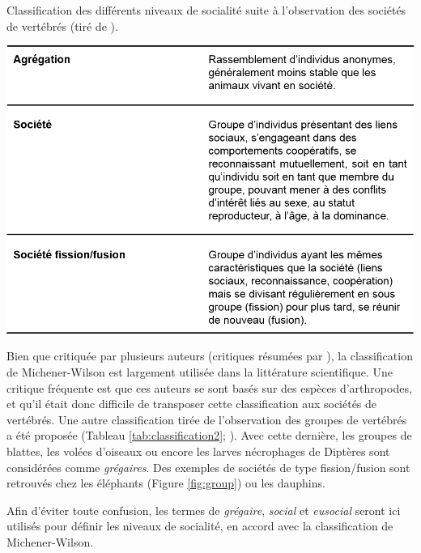 \begin{table}[p]
	\caption[Classification2]{Classification des différents niveaux de socialité suite à l'observation des sociétés de vertébrés (tiré de \citet{kerth_group_2010}).}
    \centering
	\includegraphics[width=0.8 \textwidth]{Figures/classification2.png}
		\label{tab:classification2}
\end{table}      

Bien que critiquée par plusieurs auteurs (critiques résumées par \citet{costa_other_2006}), la classification de Michener-Wilson est largement utilisée dans la littérature scientifique. Une critique fréquente est que ces auteurs se sont basés sur des espèces d'arthropodes, et qu'il était donc difficile de transposer cette classification aux sociétés de vertébrés. Une autre classification tirée de l'observation des groupes de vertébrés a été proposée (Tableau \ref{tab:classification2}; \cite{kerth_group_2010}). Avec cette dernière, les groupes de blattes, les volées d'oiseaux ou encore les larves nécrophages de Diptères sont considérées comme \textit{grégaires}. Des exemples de sociétés de type fission/fusion sont retrouvés chez les éléphants (Figure \ref{fig:group}) ou les dauphins. 

Afin d'éviter toute confusion, les termes de \textit{grégaire}, \textit{social} et \textit{eusocial} seront ici utilisés pour définir les niveaux de socialité, en accord avec la classification de Michener-Wilson.
    
  

